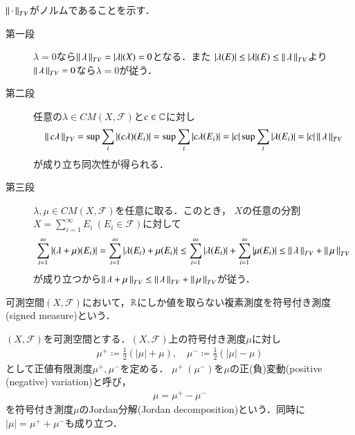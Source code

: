 	\begin{prf}\mbox{}
		$\left\|\, \cdot\, \right\|_{TV}$がノルムであることを示す．
		\begin{description}
			\item[第一段]
				$\lambda = 0$なら$\left\|\, \lambda\, \right\|_{TV} = |\lambda|(X) = 0$となる．また
				$|\lambda(E)| \leq |\lambda|(E) \leq \left\|\, \lambda\, \right\|_{TV}$より
				$\left\|\, \lambda\, \right\|_{TV} = 0$なら$\lambda=0$が従う．
			
			\item[第二段]
				任意の$\lambda \in CM(X,\mathscr{F})$と$c \in \mathbb{C}$に対し
				\begin{align}
					\left\|\, c\lambda\, \right\|_{TV} = \operatorname*{sup}_{} \sum_{i}|(c\lambda)(E_i)| = \operatorname*{sup}_{} \sum_{i}|c\lambda(E_i)| = |c|\operatorname*{sup}_{} \sum_{i}|\lambda(E_i)| = |c|\left\|\, \lambda\, \right\|_{TV}
				\end{align}
				が成り立ち同次性が得られる．
			
			\item[第三段]
				$\lambda,\mu \in CM(X,\mathscr{F})$を任意に取る．このとき，
				$X$の任意の分割$X = \sum_{i=1}^\infty E_i\ (E_i \in \mathscr{F})$に対して
				\begin{align}
					\sum_{i=1}^\infty |(\lambda + \mu)(E_i)| 
					= \sum_{i=1}^\infty |\lambda(E_i) + \mu(E_i)| 
					\leq \sum_{i=1}^\infty |\lambda(E_i)| + \sum_{i=1}^\infty |\mu(E_i)| \leq \left\|\, \lambda\, \right\|_{TV} + \left\|\, \mu\, \right\|_{TV}
				\end{align}
				が成り立つから$\left\|\, \lambda + \mu\, \right\|_{TV} \leq \left\|\, \lambda\, \right\|_{TV} + \left\|\, \mu\, \right\|_{TV}$が従う．
				\QED
		\end{description}
	\end{prf}
	
	可測空間$(X,\mathscr{F})$において，$\mathbb{R}$にしか値を取らない複素測度を符号付き測度(signed measure)という．
	\begin{screen}
		\begin{dfn}
			$(X,\mathscr{F})$を可測空間とする．$(X,\mathscr{F})$上の符号付き測度$\mu$に対し
			\begin{align}
				\mu^+ \coloneqq \frac{1}{2}(|\mu| + \mu) , \quad \mu^- \coloneqq \frac{1}{2}(|\mu| - \mu)
			\end{align}
			として正値有限測度$\mu^+,\mu^-$を定める．
			$\mu^+\ (\mu^-)$を$\mu$の正(負)変動(positive (negative) variation)と呼び，
			\begin{align}
				\mu = \mu^+ - \mu^-
			\end{align}
			を符号付き測度$\mu$のJordan分解(Jordan decomposition)という．同時に$|\mu| = \mu^+ + \mu^-$も成り立つ．
		\end{dfn}
	\end{screen}
	
